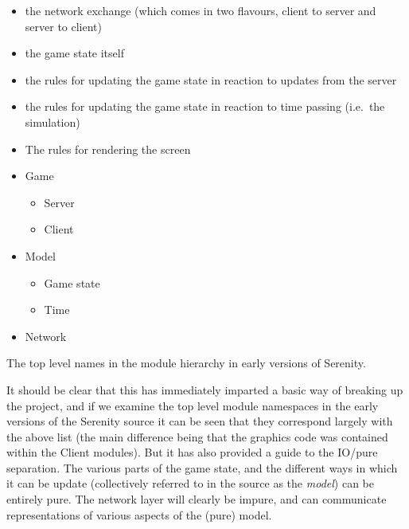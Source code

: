 \begin{itemize}\itemsep-3pt
    \item the network exchange (which comes in two flavours, client to server and server to client) 
    \item the game state itself
    \item the rules for updating the game state in reaction to updates from the server
    \item the rules for updating the game state in reaction to time passing (i.e.\ the simulation)
    \item The rules for rendering the screen
\end{itemize}

\begin{marginfigure}[6em]
	\begin{itemize}\parskip-3pt
    \item Game \begin{itemize}\itemsep-3pt
            \item Server
            \item Client
        \end{itemize}
    \item Model\begin{itemize}\itemsep-3pt
            \item Game state
            \item Time
        \end{itemize}
    \item Network
\end{itemize}
	\caption[The top level names in the module hierarchy in early versions of Serenity.]{The top level names in the module hierarchy in early versions of Serenity.}
	\label{fig:loops}
\end{marginfigure}

\noindent It should be clear that this has immediately imparted a basic way of breaking up the project, and if we examine the top level module namespaces in the early versions of the Serenity source it can be seen that they correspond largely with the above list (the main difference being that the graphics code was contained within the Client modules). But it has also provided a guide to the IO/pure separation. The various parts of the game state, and the different ways in which it can be update (collectively referred to in the source as the \emph{model}) can be entirely pure. The network layer will clearly be impure, and can communicate representations of various aspects of the (pure) model.

